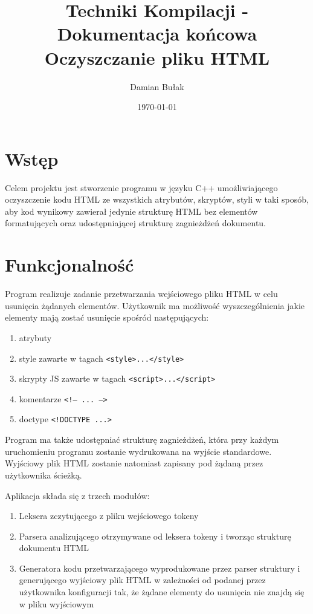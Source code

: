 \documentclass[11pt]{article}
\title{Techniki Kompilacji - Dokumentacja końcowa \\ \large Oczyszczanie pliku HTML}
\author{Damian Bułak}
\date{\today}
\def\code#1{\texttt{#1}}
\begin{document}
\maketitle

\section{Wstęp}
Celem projektu jest stworzenie programu w języku C++ umożliwiającego oczyszczenie kodu HTML ze wszystkich atrybutów, skryptów, styli w taki sposób, aby kod wynikowy zawierał jedynie strukturę HTML bez elementów formatujących oraz udostępniającej strukturę zagnieżdżeń dokumentu.

\section{Funkcjonalność}
Program realizuje zadanie przetwarzania wejściowego pliku HTML w celu usunięcia żądanych elementów. Użytkownik ma możliwość wyszczególnienia jakie elementy mają zostać usunięcie spośród następujących:
\begin{enumerate}
\item atrybuty
\item style zawarte w tagach \code{<style>...</style>}
\item skrypty JS zawarte w tagach \code{<script>...</script>}
\item komentarze \code{<!-- ... -->}
\item doctype \code{<!DOCTYPE ...>}
\end{enumerate}

Program ma także udostępniać strukturę zagnieżdżeń, która przy każdym uruchomieniu programu zostanie wydrukowana na wyjście standardowe.\\
Wyjściowy plik HTML zostanie natomiast zapisany pod żądaną przez użytkownika ścieżką.

Aplikacja składa się z trzech modułów:
\begin{enumerate}
\item Leksera zczytującego z pliku wejściowego tokeny
\item Parsera analizującego otrzymywane od leksera tokeny i tworząc strukturę dokumentu HTML
\item Generatora kodu przetwarzającego wyprodukowane przez parser struktury i generującego wyjściowy plik HTML w zależności od podanej przez użytkownika konfiguracji tak, że żądane elementy do usunięcia nie znajdą się w pliku wyjściowym
\end{enumerate}
\end{document}
